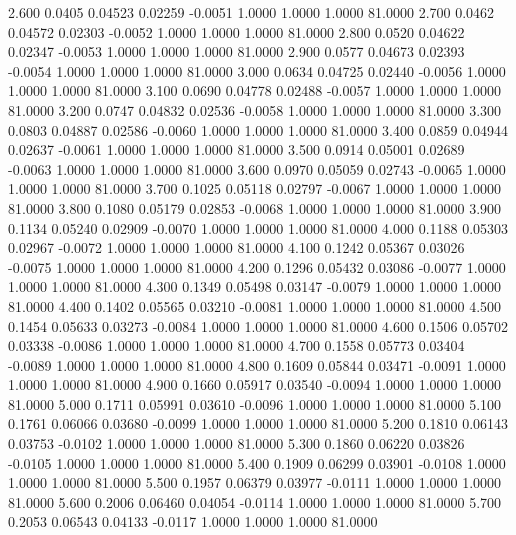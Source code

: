    2.600   0.0405   0.04523   0.02259  -0.0051   1.0000   1.0000   1.0000  81.0000
   2.700   0.0462   0.04572   0.02303  -0.0052   1.0000   1.0000   1.0000  81.0000
   2.800   0.0520   0.04622   0.02347  -0.0053   1.0000   1.0000   1.0000  81.0000
   2.900   0.0577   0.04673   0.02393  -0.0054   1.0000   1.0000   1.0000  81.0000
   3.000   0.0634   0.04725   0.02440  -0.0056   1.0000   1.0000   1.0000  81.0000
   3.100   0.0690   0.04778   0.02488  -0.0057   1.0000   1.0000   1.0000  81.0000
   3.200   0.0747   0.04832   0.02536  -0.0058   1.0000   1.0000   1.0000  81.0000
   3.300   0.0803   0.04887   0.02586  -0.0060   1.0000   1.0000   1.0000  81.0000
   3.400   0.0859   0.04944   0.02637  -0.0061   1.0000   1.0000   1.0000  81.0000
   3.500   0.0914   0.05001   0.02689  -0.0063   1.0000   1.0000   1.0000  81.0000
   3.600   0.0970   0.05059   0.02743  -0.0065   1.0000   1.0000   1.0000  81.0000
   3.700   0.1025   0.05118   0.02797  -0.0067   1.0000   1.0000   1.0000  81.0000
   3.800   0.1080   0.05179   0.02853  -0.0068   1.0000   1.0000   1.0000  81.0000
   3.900   0.1134   0.05240   0.02909  -0.0070   1.0000   1.0000   1.0000  81.0000
   4.000   0.1188   0.05303   0.02967  -0.0072   1.0000   1.0000   1.0000  81.0000
   4.100   0.1242   0.05367   0.03026  -0.0075   1.0000   1.0000   1.0000  81.0000
   4.200   0.1296   0.05432   0.03086  -0.0077   1.0000   1.0000   1.0000  81.0000
   4.300   0.1349   0.05498   0.03147  -0.0079   1.0000   1.0000   1.0000  81.0000
   4.400   0.1402   0.05565   0.03210  -0.0081   1.0000   1.0000   1.0000  81.0000
   4.500   0.1454   0.05633   0.03273  -0.0084   1.0000   1.0000   1.0000  81.0000
   4.600   0.1506   0.05702   0.03338  -0.0086   1.0000   1.0000   1.0000  81.0000
   4.700   0.1558   0.05773   0.03404  -0.0089   1.0000   1.0000   1.0000  81.0000
   4.800   0.1609   0.05844   0.03471  -0.0091   1.0000   1.0000   1.0000  81.0000
   4.900   0.1660   0.05917   0.03540  -0.0094   1.0000   1.0000   1.0000  81.0000
   5.000   0.1711   0.05991   0.03610  -0.0096   1.0000   1.0000   1.0000  81.0000
   5.100   0.1761   0.06066   0.03680  -0.0099   1.0000   1.0000   1.0000  81.0000
   5.200   0.1810   0.06143   0.03753  -0.0102   1.0000   1.0000   1.0000  81.0000
   5.300   0.1860   0.06220   0.03826  -0.0105   1.0000   1.0000   1.0000  81.0000
   5.400   0.1909   0.06299   0.03901  -0.0108   1.0000   1.0000   1.0000  81.0000
   5.500   0.1957   0.06379   0.03977  -0.0111   1.0000   1.0000   1.0000  81.0000
   5.600   0.2006   0.06460   0.04054  -0.0114   1.0000   1.0000   1.0000  81.0000
   5.700   0.2053   0.06543   0.04133  -0.0117   1.0000   1.0000   1.0000  81.0000
